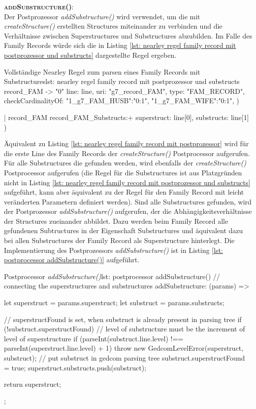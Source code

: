 \textsc{\textbf{addSubstructure()}:} \vspace{0.5em} \\
Der Postprozessor \textit{addSubstructure()} wird verwendet, um die mit \textit{createStructure()} erstellten Structures miteinander zu verbinden und die Verhältnisse zwischen Superstructures und Substructures abzubilden. Im Falle des Family Records würde sich die in Listing \ref{lst: nearley regel family record mit postprozessor und substructs} dargestellte Regel ergeben. 
\vspace{1em}
\begin{javascript}{Vollständige Nearley Regel zum parsen eines Family Records mit Substructures}{lst: nearley regel family record mit postprozessor und substructs}
	record_FAM
		-> "0"  %
			{%
					line: line,
					uri: "g7_record_FAM", 
					type: "FAM_RECORD", 
					checkCardinalityOf: {
						"1_g7_FAM_HUSB":"0:1", 
						"1_g7_FAM_WIFE":"0:1",
					}
				}) 
		
		|  record_FAM  record_FAM_Substructs:+
			{%
					superstruct: line[0], 
					substructs: line[1]
				})
\end{javascript}
\vspace{1em}
Äquivalent zu Listing \ref{lst: nearley regel family record mit postprozessor} wird für die erste Line des Family Records der \textit{createStructure()} Postprocessor aufgerufen. Für alle Substructures die gefunden werden, wird ebenfalls der \textit{createStructure()} Postprocessor aufgerufen (die Regel für die Substructures ist aus Platzgründen nicht in Listing \ref{lst: nearley regel family record mit postprozessor und substructs} aufgeführt, kann aber äquivalent zu der Regel für den Family Record mit leicht veränderten Parametern definiert werden). Sind alle Substructures gefunden, wird der Postprozessor \textit{addSubstructure()} aufgerufen, der die Abhängigkeitsverhältnisse der Structures zueinander abbildet. Dazu werden beim Family Record alle gefundenen Subtructures in der Eigenschaft Substructures und äquivalent dazu bei allen Substructures der Family Record als Superstructure hinterlegt. Die Implementierung des Postprozessors \textit{addSubstructure()} ist in Listing \ref{lst: postprocessor addSubstructure()} aufgeführt.
\vspace{1em}
\begin{javascript}{Postprocessor \textit{addSubstructure()}}{lst: postprocessor addSubstructure()}
	// connecting the superstructures and substructures
	addSubstructure: (params) => {
		let superstruct = params.superstruct;
		let substruct = params.substructs;
		
		// superstructFound is set, when substruct is already present in parsing tree
		if (!substruct.superstructFound) {
			// level of substructure must be the increment of level of superstructure
			if (parseInt(substruct.line.level) !== parseInt(superstruct.line.level) + 1) throw new GedcomLevelError(superstruct, substruct);
			// put substruct in gedcom parsing tree
			substruct.superstructFound = true;
			superstruct.substructs.push(substruct);
		}
		
		return superstruct;
	};
\end{javascript}
